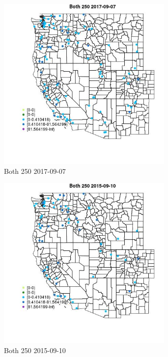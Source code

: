 \begin{figure} 
\centering  
\includegraphics[width=0.77\textwidth]{Code_Outputs/Report_ML_input_PM25_Step4_part_e_de_duplicated_aveswNAs_MapObsBoth_2502017-09-07.jpg} 
\caption{\label{fig:Report_ML_input_PM25_Step4_part_e_de_duplicated_aveswNAsMapObsBoth_2502017-09-07}Both 250 2017-09-07} 
\end{figure} 
 

\begin{figure} 
\centering  
\includegraphics[width=0.77\textwidth]{Code_Outputs/Report_ML_input_PM25_Step4_part_e_de_duplicated_aveswNAs_MapObsBoth_2502015-09-10.jpg} 
\caption{\label{fig:Report_ML_input_PM25_Step4_part_e_de_duplicated_aveswNAsMapObsBoth_2502015-09-10}Both 250 2015-09-10} 
\end{figure} 
 

